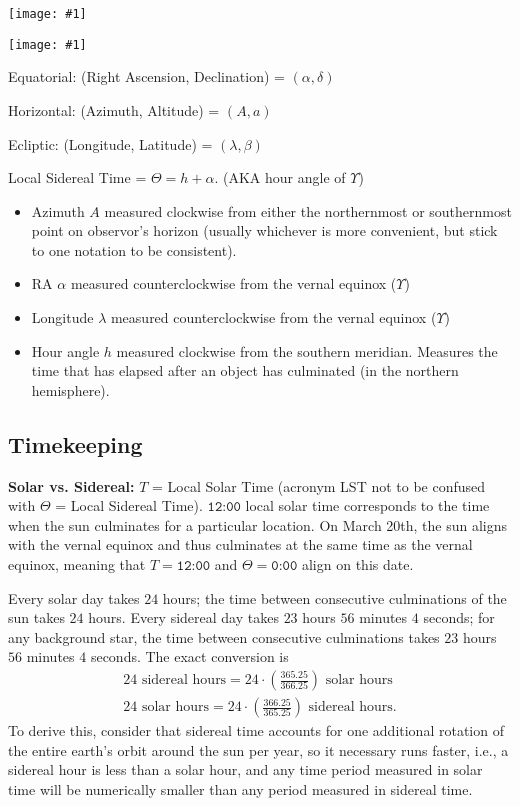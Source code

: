 \documentclass[11pt]{article}
\newcommand{\V}{

\vspace{\baselineskip}

}
\newcommand{\image}[1]{
\begin{center}
    \texttt{[image: \#1]}
\end{center}

}
\begin{document}
\image{images/rah.png}
\image{images/conversion.png}

Equatorial: (Right Ascension, Declination) = $(\alpha, \delta)$

Horizontal: (Azimuth, Altitude) = $(A, a)$

Ecliptic: (Longitude, Latitude) = $(\lambda, \beta)$

Local Sidereal Time = $\Theta = h + \alpha$. (AKA hour angle of $\Upsilon$)

\begin{itemize}
\item Azimuth $A$ measured clockwise from either the northernmost or southernmost point on observor's horizon (usually whichever is more convenient, but stick to one notation to be consistent). 

\item RA $\alpha$ measured counterclockwise from the vernal equinox ($\Upsilon$)

\item Longitude $\lambda$ measured counterclockwise from the vernal equinox ($\Upsilon$)

\item Hour angle $h$ measured clockwise from the southern meridian. Measures the time that has elapsed after an object has culminated (in the northern hemisphere).
\end{itemize}

\subsection{Timekeeping}

\textbf{Solar vs. Sidereal:} $T$ = Local Solar Time (acronym LST not to be confused with $\Theta$ = Local Sidereal Time). $\texttt{12:00}$ local solar time corresponds to the time when the sun culminates for a particular location. On March 20th, the sun aligns with the vernal equinox and thus culminates at the same time as the vernal equinox, meaning that $T = \texttt{12:00}$ and $\Theta = \texttt{0:00}$ align on this date.

Every solar day takes $24$ hours; the time between consecutive culminations of the sun takes $24$ hours. Every sidereal day takes $23$ hours $56$ minutes $4$ seconds; for any background star, the time between consecutive culminations takes $23$ hours $56$ minutes $4$ seconds. The exact conversion is 
\begin{gather*}
    24\text{ sidereal hours} = 24\cdot \left(\frac{365.25}{366.25}\right)\text{ solar hours} \\
    24\text{ solar hours} = 24\cdot \left(\frac{366.25}{365.25}\right)\text{ sidereal hours}. 
\end{gather*}
To derive this, consider that sidereal time accounts for one additional rotation of the entire earth's orbit around the sun per year, so it necessary runs faster, i.e., a sidereal hour is less than a solar hour, and any time period measured in solar time will be numerically smaller than any period measured in sidereal time.\V
\end{document}

